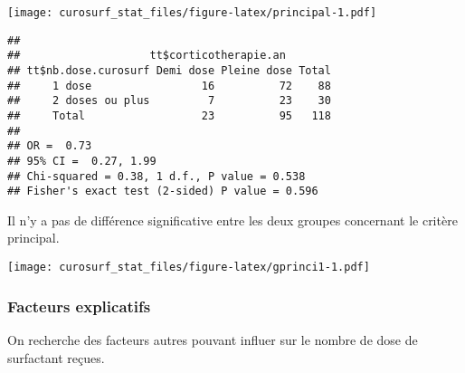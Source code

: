 \documentclass[
  10pt,
  a4paper,
]{scrartcl}
\begin{document}
\texttt{[image: curosurf\_stat\_files/figure-latex/principal-1.pdf]}

\begin{verbatim}
## 
##                    tt$corticotherapie.an
## tt$nb.dose.curosurf Demi dose Pleine dose Total
##     1 dose                 16          72    88
##     2 doses ou plus         7          23    30
##     Total                  23          95   118
## 
## OR =  0.73 
## 95% CI =  0.27, 1.99  
## Chi-squared = 0.38, 1 d.f., P value = 0.538
## Fisher's exact test (2-sided) P value = 0.596
\end{verbatim}

Il n'y a pas de différence significative entre les deux groupes
concernant le critère principal.

\texttt{[image: curosurf\_stat\_files/figure-latex/gprinci1-1.pdf]}

\hypertarget{facteurs-explicatifs}{%
\subsubsection{Facteurs explicatifs}\label{facteurs-explicatifs}}

On recherche des facteurs autres pouvant influer sur le nombre de dose
de surfactant reçues.
\end{document}

